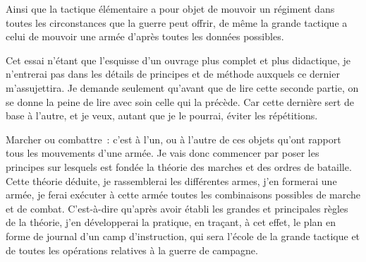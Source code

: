 \documentclass[french,twoside]{book} %
\begin{document}
Ainsi que la tactique élémentaire a pour objet de mouvoir un régiment dans toutes les circonstances que la guerre peut offrir, de même la grande tactique a celui de mouvoir une armée d’après toutes les données possibles.\par
Cet essai n’étant que l’esquisse d’un ouvrage plus complet et plus didactique, je n’entrerai pas dans les détails de principes et de méthode auxquels ce dernier m’assujettira. Je demande seulement qu’avant que de lire cette seconde partie, on se donne la peine de lire avec soin celle qui la précède. Car cette dernière sert de base à l’autre, et je veux, autant que je le pourrai, éviter les répétitions.\par
Marcher ou combattre : c’est à l’un, ou à l’autre de ces objets qu’ont rapport tous les mouvements d’une armée. Je vais donc commencer par poser les principes sur lesquels est fondée la théorie des marches et des ordres de bataille. Cette théorie déduite, je rassemblerai les différentes armes, j’en formerai une armée, je ferai exécuter à cette armée toutes les combinaisons possibles de marche et de combat. C’est-à-dire qu’après avoir établi les grandes et principales règles de la théorie, j’en développerai la pratique, en traçant, à cet effet, le plan en forme de journal d’un camp d’instruction, qui sera l’école de la grande tactique et de toutes les opérations relatives à la guerre de campagne.
\end{document}
